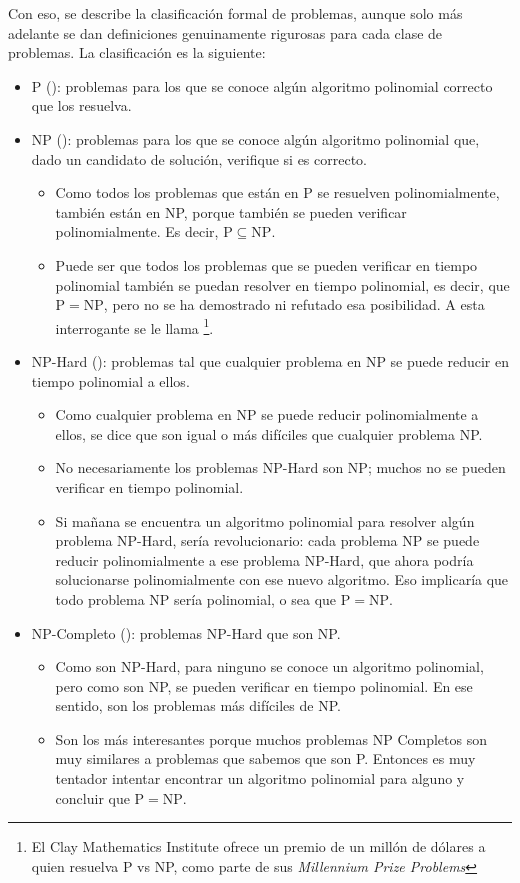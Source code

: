 Con eso, se describe la clasificación formal de problemas, aunque solo más adelante se dan definiciones genuinamente rigurosas para cada clase de problemas. La clasificación es la siguiente: 
\begin{itemize}
  \item P (): problemas para los que se conoce algún algoritmo polinomial correcto que los resuelva.
  \item NP (): problemas para los que se conoce algún algoritmo polinomial que, dado un candidato de solución, verifique si es correcto.
  \begin{itemize}
    \item Como todos los problemas que están en P se resuelven polinomialmente, también están en NP, porque también se pueden verificar polinomialmente. Es decir, \(\mathrm{P} \subseteq \mathrm{NP}\).
    \item Puede ser que todos los problemas que se pueden verificar en tiempo polinomial también se puedan resolver en tiempo polinomial, es decir, que \(\mathrm{P} = \mathrm{NP}\), pero no se ha demostrado ni refutado esa posibilidad. A esta interrogante se le llama \footnote{El Clay Mathematics Institute ofrece un premio de un millón de dólares a quien resuelva P vs NP, como parte de sus \textit{Millennium Prize Problems}}.
  \end{itemize}
  \item NP-Hard (): problemas tal que cualquier problema en NP se puede reducir en tiempo polinomial a ellos.
  \begin{itemize}
    \item Como cualquier problema en NP se puede reducir polinomialmente a ellos, se dice que son igual o más difíciles que cualquier problema NP.
    \item No necesariamente los problemas NP-Hard son NP; muchos no se pueden verificar en tiempo polinomial.
    \item Si mañana se encuentra un algoritmo polinomial para resolver algún problema NP-Hard, sería revolucionario: cada problema NP se puede reducir polinomialmente a ese problema NP-Hard, que ahora podría solucionarse polinomialmente con ese nuevo algoritmo. Eso implicaría que todo problema NP sería polinomial, o sea que \(\mathrm{P} = \mathrm{NP}\).
  \end{itemize}
  \item NP-Completo (): problemas NP-Hard que son NP.
  \begin{itemize}
    \item Como son NP-Hard, para ninguno se conoce un algoritmo polinomial, pero como son NP, se pueden verificar en tiempo polinomial. En ese sentido, son los problemas más difíciles de NP.
    \item Son los más interesantes porque muchos problemas NP Completos son muy similares a problemas que sabemos que son P. Entonces es muy tentador intentar encontrar un algoritmo polinomial para alguno y concluir que \(\mathrm{P} = \mathrm{NP}\).
  \end{itemize}
\end{itemize}

